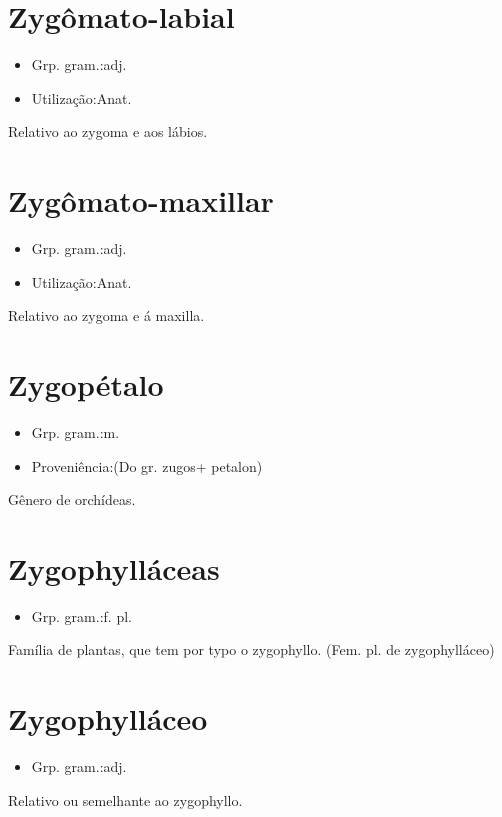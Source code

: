 \section{Zygômato-labial}
\begin{itemize}
\item {Grp. gram.:adj.}
\end{itemize}
\begin{itemize}
\item {Utilização:Anat.}
\end{itemize}
Relativo ao zygoma e aos lábios.
\section{Zygômato-maxillar}
\begin{itemize}
\item {Grp. gram.:adj.}
\end{itemize}
\begin{itemize}
\item {Utilização:Anat.}
\end{itemize}
Relativo ao zygoma e á maxilla.
\section{Zygopétalo}
\begin{itemize}
\item {Grp. gram.:m.}
\end{itemize}
\begin{itemize}
\item {Proveniência:(Do gr. \textunderscore zugos\textunderscore  + \textunderscore petalon\textunderscore )}
\end{itemize}
Gênero de orchídeas.
\section{Zygophylláceas}
\begin{itemize}
\item {Grp. gram.:f. pl.}
\end{itemize}
Família de plantas, que tem por typo o zygophyllo.
(Fem. pl. de \textunderscore zygophylláceo\textunderscore )
\section{Zygophylláceo}
\begin{itemize}
\item {Grp. gram.:adj.}
\end{itemize}
Relativo ou semelhante ao zygophyllo.

